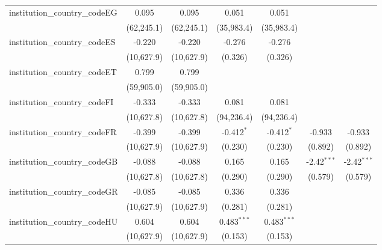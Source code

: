\begin{tabular}{lcccccc}
   institution\_country\_codeEG          & 0.095         & 0.095         & 0.051         & 0.051         &               &   \\   
                                         & (62,245.1)    & (62,245.1)    & (35,983.4)    & (35,983.4)    &               &   \\   
   institution\_country\_codeES          & -0.220        & -0.220        & -0.276        & -0.276        &               &   \\   
                                         & (10,627.9)    & (10,627.9)    & (0.326)       & (0.326)       &               &   \\   
   institution\_country\_codeET          & 0.799         & 0.799         &               &               &               &   \\   
                                         & (59,905.0)    & (59,905.0)    &               &               &               &   \\   
   institution\_country\_codeFI          & -0.333        & -0.333        & 0.081         & 0.081         &               &   \\   
                                         & (10,627.8)    & (10,627.8)    & (94,236.4)    & (94,236.4)    &               &   \\   
   institution\_country\_codeFR          & -0.399        & -0.399        & -0.412$^{*}$  & -0.412$^{*}$  & -0.933        & -0.933\\   
                                         & (10,627.9)    & (10,627.9)    & (0.230)       & (0.230)       & (0.892)       & (0.892)\\   
   institution\_country\_codeGB          & -0.088        & -0.088        & 0.165         & 0.165         & -2.42$^{***}$ & -2.42$^{***}$\\   
                                         & (10,627.8)    & (10,627.8)    & (0.290)       & (0.290)       & (0.579)       & (0.579)\\   
   institution\_country\_codeGR          & -0.085        & -0.085        & 0.336         & 0.336         &               &   \\   
                                         & (10,627.9)    & (10,627.9)    & (0.281)       & (0.281)       &               &   \\   
   institution\_country\_codeHU          & 0.604         & 0.604         & 0.483$^{***}$ & 0.483$^{***}$ &               &   \\   
                                         & (10,627.9)    & (10,627.9)    & (0.153)       & (0.153)       &               &   \\   

\end{tabular}
